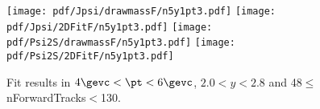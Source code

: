 \begin{figure}[H]
\begin{center}
\texttt{[image: pdf/Jpsi/drawmassF/n5y1pt3.pdf]}
\texttt{[image: pdf/Jpsi/2DFitF/n5y1pt3.pdf]}
\vspace*{-0.5cm}
\texttt{[image: pdf/Psi2S/drawmassF/n5y1pt3.pdf]}
\texttt{[image: pdf/Psi2S/2DFitF/n5y1pt3.pdf]}
\vspace*{-0.5cm}
\end{center}
\caption{Fit results in $4\gevc<\pt<6\gevc$, $2.0<y<2.8$ and 48$\leq$nForwardTracks$<$130.}
\label{Fitn5y1pt3}
\end{figure}
